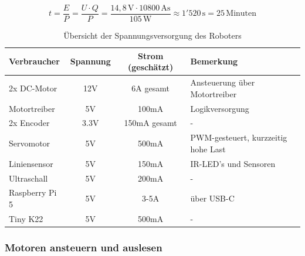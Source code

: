 \begin{equation}
    t = \frac{E}{P} = \frac{U \cdot Q}{P} = \frac{14{,}8\,\text{V} \cdot 10800\,\text{As}}{105\,\text{W}} \approx 1{'}520\,\text{s} = 25\,\text{Minuten} 
    \label{eq:Energieverbrauch}
\end{equation}



\newpage

\begin{table}[h!]
\centering
\renewcommand{\arraystretch}{1.3}
\begin{tabular}{@{} l c c l @{}}
\toprule
\textbf{Verbraucher}         & \textbf{Spannung} & \textbf{Strom (geschätzt)} & \textbf{Bemerkung} \\
\midrule
2x DC-Motor                  & 12V              & 6A gesamt               & Ansteuerung über Motortreiber \\

Motortreiber & 5V               &  100mA              & Logikversorgung \\

2x Encoder & 3.3V               &  150mA gesamt             &- \\

Servomotor                   & 5V               &  500mA                 & PWM-gesteuert, kurzzeitig hohe Last \\

Liniensensor         & 5V               &  150mA                  & IR-LED's und Sensoren \\

Ultraschall & 5V               &  200mA              &- \\

Raspberry Pi 5              & 5V               & 3-5A                      & über USB-C \\

Tiny K22             & 5V               & 500mA                      & - \\

\bottomrule
\end{tabular}
\caption{Übersicht der Spannungsversorgung des Roboters}
\label{tab:spannungsversorgung}
\end{table}





\subsubsection{Motoren ansteuern und auslesen}
\label{motoren-encoder}

